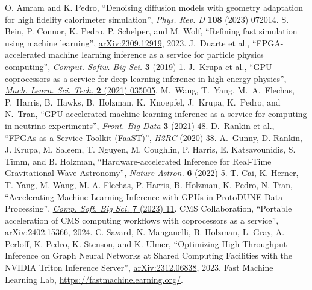 \begin{thebibliography}{99}
 O. Amram and K. Pedro, ``Denoising diffusion models with geometry adaptation for high fidelity calorimeter simulation'', \href{https://doi.org/10.1103/PhysRevD.108.072014}{\textit{Phys. Rev. D} \textbf{108} (2023) 072014}.
 S. Bein, P. Connor, K. Pedro, P. Schelper, and M. Wolf, ``Refining fast simulation using machine learning'', \href{https://arxiv.org/abs/2309.12919}{arXiv:2309.12919}, 2023.
 J.~Duarte et al., ``FPGA-accelerated machine learning inference as a service for particle physics computing'', \href{https://doi.org/10.1007/s41781-019-0027-2}{\textit{Comput. Softw. Big Sci.} \textbf{3} (2019) 1}.
 J.~Krupa et al., ``GPU coprocessors as a service for deep learning inference in high energy physics'', \href{https://doi.org/10.1088/2632-2153/abec21}{\textit{Mach. Learn. Sci. Tech.} \textbf{2} (2021) 035005}.
 M.~Wang, T.~Yang, M.~A.~Flechas, P.~Harris, B.~Hawks, B.~Holzman, K.~Knoepfel, J.~Krupa, K.~Pedro, and N.~Tran, ``GPU-accelerated machine learning inference as a service for computing in neutrino experiments'', \href{https://doi.org/10.3389/fdata.2020.604083}{\textit{Front. Big Data} \textbf{3} (2021) 48}.
 D.~Rankin et al., ``FPGAs-as-a-Service Toolkit (FaaST)'', \href{https://doi.org/10.1109/H2RC51942.2020.00010}{\textit{H2RC} (2020) 38}.
 A.~Gunny, D. Rankin, J. Krupa, M. Saleem, T. Nguyen, M. Coughlin, P. Harris, E. Katsavounidis, S. Timm, and B. Holzman, ``Hardware-accelerated Inference for Real-Time Gravitational-Wave Astronomy'', \href{https://doi.org/10.1038/s41550-022-01651-w}{\textit{Nature Astron.} \textbf{6} (2022) 5}.
 T. Cai, K. Herner, T. Yang, M. Wang, M. A. Flechas, P. Harris, B. Holzman, K. Pedro, N. Tran, ``Accelerating Machine Learning Inference with GPUs in ProtoDUNE Data Processing'', \href{https://doi.org/10.1007/s41781-023-00101-0}{\textit{Comp. Soft. Big Sci.} \textbf{7} (2023) 11}.
 CMS Collaboration, ``Portable acceleration of CMS computing workflows with coprocessors as a service'', \href{https://arxiv.org/abs/2402.15366}{arXiv:2402.15366}, 2024.
 C. Savard, N. Manganelli, B. Holzman, L. Gray, A. Perloff, K. Pedro, K. Stenson, and K. Ulmer, ``Optimizing High Throughput Inference on Graph Neural Networks at Shared Computing Facilities with the NVIDIA Triton Inference Server'', \href{https://arxiv.org/abs/2312.06838}{arXiv:2312.06838}, 2023.
 Fast Machine Learning Lab, \href{https://fastmachinelearning.org/}{https://fastmachinelearning.org/}.

\end{thebibliography}
